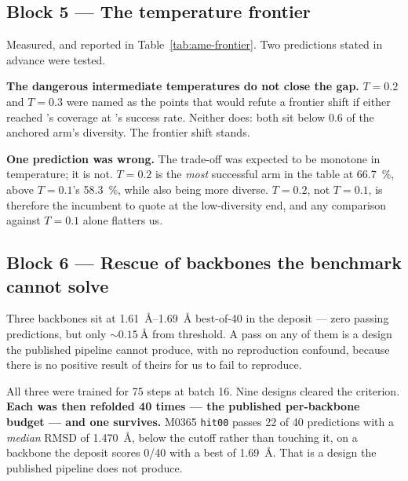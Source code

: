 
\subsection*{Block 5 --- The temperature frontier}

Measured, and reported in Table~\ref{tab:ame-frontier}. Two predictions stated
in advance were tested.

\textbf{The dangerous intermediate temperatures do not close the gap.} $T=0.2$
and $T=0.3$ were named as the points that would refute a frontier shift if
either reached \cleo{}'s coverage at \cleo{}'s success rate. Neither does: both
sit below \num{0.6} of the anchored arm's diversity. The frontier shift stands.

\textbf{One prediction was wrong.} The trade-off was expected to be monotone in
temperature; it is not. $T=0.2$ is the \emph{most} successful arm in the table
at \SI{66.7}{\percent}, above $T=0.1$'s \SI{58.3}{\percent}, while also being
more diverse. $T=0.2$, not $T=0.1$, is therefore the incumbent to quote at the
low-diversity end, and any comparison against $T=0.1$ alone flatters us.


\subsection*{Block 6 --- Rescue of backbones the benchmark cannot solve}

Three backbones sit at \SIrange{1.61}{1.69}{\angstrom} best-of-40 in the deposit
--- zero passing predictions, but only ${\sim}\SI{0.15}{\angstrom} $ from
threshold. A pass on any of them is a design the published pipeline cannot
produce, with no reproduction confound, because there is no positive result of
theirs for us to fail to reproduce.

All three were trained for 75 steps at batch 16. Nine designs cleared the
criterion. \textbf{Each was then refolded 40 times --- the published
per-backbone budget --- and one survives.} M0365 \texttt{hit00} passes
\num{22} of \num{40} predictions with a \emph{median} RMSD of
\SI{1.470}{\angstrom}, below the cutoff rather than touching it, on a backbone
the deposit scores 0/40 with a best of \SI{1.69}{\angstrom}. That is a design
the published pipeline does not produce.


